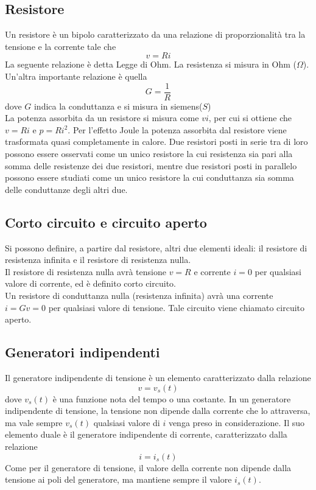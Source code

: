 \documentclass[a4paper,12pt]{article}
\begin{document}
\subsection{Resistore}
Un resistore è un bipolo caratterizzato da una relazione di proporzionalità tra la tensione e la corrente tale che 
$$v = Ri$$
La seguente relazione è detta Legge di Ohm. La resistenza si misura in Ohm ($\Omega$). Un'altra importante relazione è quella 
$$ G = \frac{1}{R}$$
dove $G$ indica la conduttanza e si misura in siemens($S$)\\
La potenza assorbita da un resistore si misura come $vi$, per cui si ottiene che $v = Ri$ e $p = Ri^{2}$. Per l'effetto Joule la potenza assorbita dal resistore viene trasformata quasi completamente in calore.
Due resistori posti in serie tra di loro possono essere osservati come un unico resistore la cui resistenza sia pari alla somma delle resistenze dei due resistori, mentre due resistori posti in parallelo possono essere studiati come un unico resistore la cui conduttanza sia somma delle conduttanze degli altri due.
\subsection{Corto circuito e circuito aperto}
Si possono definire, a partire dal resistore, altri due elementi ideali: il resistore di resistenza infinita e il resistore di resistenza nulla. \\
Il resistore di resistenza nulla avrà tensione $v = R$ e corrente $i = 0$ per qualsiasi valore di corrente, ed è definito corto circuito. \\
Un resistore di conduttanza nulla (resistenza infinita) avrà una corrente $i = Gv = 0$ per qualsiasi valore di tensione. Tale circuito viene chiamato circuito aperto.
\subsection{Generatori indipendenti}
Il generatore indipendente di tensione è un elemento caratterizzato dalla relazione $$
v = v_s(t)$$
dove $v_s(t)$ è una funzione nota del tempo o una costante. In un generatore indipendente di tensione, la tensione non dipende dalla corrente che lo attraversa, ma vale sempre $v_s(t)$ qualsiasi valore di $i$ venga preso in considerazione.
Il suo elemento duale è il generatore indipendente di corrente, caratterizzato dalla relazione $$i = i_s(t)$$
Come per il generatore di tensione, il valore della corrente non dipende dalla tensione ai poli del generatore, ma mantiene sempre il valore $i_s(t)$.
\end{document}

